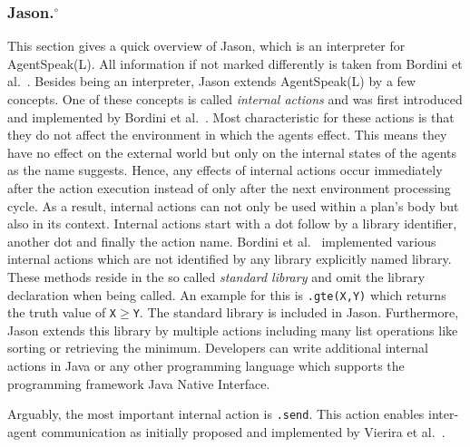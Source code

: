 \subsubsection[Jason.]{Jason.$^\circ$}
This section gives a quick overview of Jason, which is an interpreter for AgentSpeak(L). All information if not marked differently is taken from Bordini et al.~\cite{bordini_jason_2005}. Besides being an interpreter, Jason extends AgentSpeak(L) by a few concepts. One of these concepts is called \emph{internal actions} and was first introduced and implemented by Bordini et al.~\cite{bordini_agentspeak_2002}. Most characteristic for these actions is that they do not affect the environment in which the agents effect. This means they have no effect on the external world but only on the internal states of the agents as the name suggests. Hence, any effects of internal actions occur immediately after the action execution instead of only after the next environment processing cycle. As a result, internal actions can not only be used within a plan's body but also in its context. %
Internal actions start with a dot follow by a library identifier, another dot and finally the action name. Bordini et al.~\cite{bordini_agentspeak_2002} implemented various internal actions which are not identified by any library explicitly named library. These methods reside in the so called \emph{standard library} and omit the library declaration when being called. An example for this is \texttt{.gte(X,Y)} which returns the truth value of \texttt{X}$\geq$\texttt{Y}. The standard library is included in Jason. Furthermore, Jason extends this library by multiple actions including many list operations like sorting or retrieving the minimum. Developers can write additional internal actions in Java or any other programming language which supports the programming framework Java Native Interface. %

Arguably, the most important  internal action is \texttt{.send}. This action enables inter-agent communication as initially proposed and implemented by Vierira et al.~\cite{vieira_formal_2007}.
